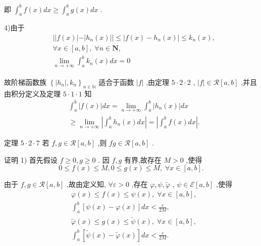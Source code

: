 即 ${\int }_{a}^{b}f\left( x\right) {dx} \geq  {\int }_{a}^{b}g\left( x\right) {dx}$ .

4)由于
\begin{align*}
	&\left| \right| f\left( x\right) \left| -\right| {h}_{n}\left( x\right) \left| \right|  \leq  \left| {f\left( x\right)  - {h}_{n}\left( x\right) }\right|  \leq  {k}_{n}\left( x\right) ,\\
	&\forall x \in  \left\lbrack  {a,b}\right\rbrack  ,\;\forall n \in  \mathbf{N},\\
	&\mathop{\lim }\limits_{{n \rightarrow   + \infty }}{\int }_{a}^{b}{k}_{n}\left( x\right) {dx} = 0
\end{align*}

故阶梯函数族 ${\left\{  \left| {h}_{n}\right| ,{k}_{n}\right\}  }_{n \in  \mathbb{N}}$ 适合于函数 $\left| f\right|$ ,由定理 $5 \cdot  2 \cdot  2$ , $\left| f\right|  \in  \mathcal{R}\left\lbrack  {a,b}\right\rbrack$ ,并且由积分定义及定理 $5 \cdot  1 \cdot  1$ 知
\begin{align*}
	&{\int }_{a}^{b}\left| {f\left( x\right) }\right| {dx} = \mathop{\lim }\limits_{{n \rightarrow   + \infty }}{\int }_{a}^{b}\left| {{h}_{n}\left( x\right) }\right| {dx}\\
	&\geq  \mathop{\lim }\limits_{{n \rightarrow   + \infty }}\left| {{\int }_{a}^{b}{h}_{n}\left( x\right) {dx}}\right|  = \left| {{\int }_{a}^{b}f\left( x\right) {dx}}\right| .
\end{align*}

定理 $5 \cdot  2 \cdot  7$ 若 $f,g \in  \mathcal{R}\left\lbrack  {a,b}\right\rbrack$ ,则 ${fg} \in  \mathcal{R}\left\lbrack  {a,b}\right\rbrack$ .

证明 1) 首先假设 $f \geq  0,g \geq  0$ . 因 $f,g$ 有界,故存在 $M > 0$ ,使得
$$0 \leq  f\left( x\right)  \leq  M,0 \leq  g\left( x\right)  \leq  M,\;\forall x \in  \left\lbrack  {a,b}\right\rbrack  .$$

由于 $f,g \in  \mathcal{R}\left\lbrack  {a,b}\right\rbrack$ ,故由定义知, $\forall \varepsilon  > 0$ ,存在 $\varphi ,\psi ,\widetilde{\varphi }$ , $\psi  \in  \mathcal{E}\left\lbrack  {a,b}\right\rbrack$ ,使得
\begin{align*}
	&\varphi \left( x\right)  \leq  f\left( x\right)  \leq  \psi \left( x\right) ,\;\forall x \in  \left\lbrack  {a,b}\right\rbrack  ,\\
	&{\int }_{a}^{b}\left\lbrack  {\psi \left( x\right)  - \varphi \left( x\right) }\right\rbrack  {dx} < \frac{\varepsilon }{2M},\\
	&\widetilde{\varphi }\left( x\right)  \leq  g\left( x\right)  \leq  \widetilde{\psi }\left( x\right) ,\;\forall x \in  \left\lbrack  {a,b}\right\rbrack  ,\\
	&{\int }_{a}^{b}\left\lbrack  {\widetilde{\psi }\left( x\right)  - \widetilde{\varphi }\left( x\right) }\right\rbrack  {dx} < \frac{\varepsilon }{2M}.
\end{align*}

